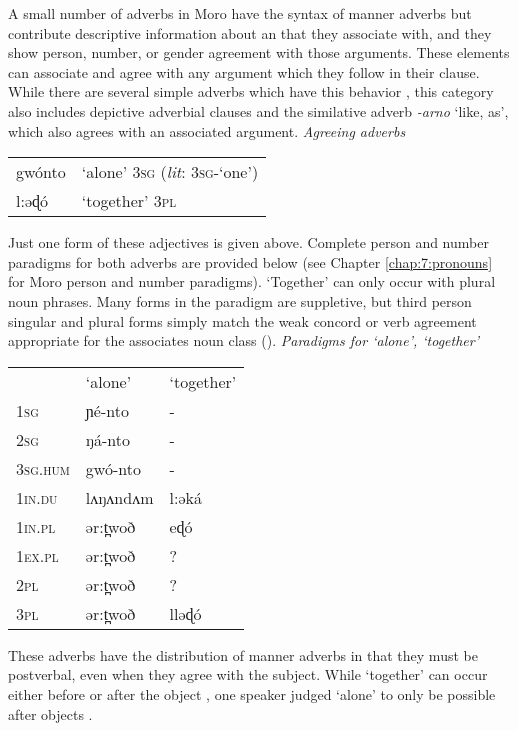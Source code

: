 A small number of adverbs in Moro have the syntax of manner adverbs but contribute descriptive information about an that they associate with, and they show person, number, or gender agreement with those arguments. These elements can associate and agree with any argument which they follow in their clause. While there are several simple adverbs which have this behavior , this category also includes depictive adverbial clauses and the similative adverb \textit{-arno} `like, as', which also agrees with an associated argument.  
\ea \textit{Agreeing adverbs}\\ %
\begin{tabular}{ll}
gwónto & `alone'  \textsc{3sg} (\textit{lit}: \textsc{3sg}-`one')\\
l:əɖó & `together' \textsc{3pl}\\
\end{tabular}
\z 
Just one form of these adjectives is given above. Complete person and number paradigms for both adverbs are provided below (see Chapter \ref{chap:7:pronouns} for Moro person and number paradigms). `Together' can only occur with plural noun phrases. Many forms in the paradigm are suppletive, but third person singular and plural forms simply match the weak concord or verb agreement appropriate for the associates noun class ().
\ea \textit{Paradigms for `alone', `together'}\\
\begin{tabular}{lll}
& `alone' & `together' \\
1\textsc{sg} 		& ɲé-nto	&  - \\ 
2\textsc{sg} 		& ŋá-nto &  - \\
3\textsc{sg.hum} 	& gwó-nto	 & - \\
1\textsc{in}.\textsc{du} & lʌŋʌndʌm & l:əká\\
1\textsc{in}.\textsc{pl} & ər:t̪woð & eɖó\\
1\textsc{ex}.\textsc{pl} & ər:t̪woð & ? \\
2\textsc{pl} 		&  ər:t̪woð & ?\\
3\textsc{pl} 		&  ər:t̪woð & lləɖó\\
\end{tabular}
\z 

These adverbs have the distribution of manner adverbs in that they must be postverbal, even when they agree with the subject. While `together' can occur either before or after the object , one speaker judged `alone' to only be possible after objects .

